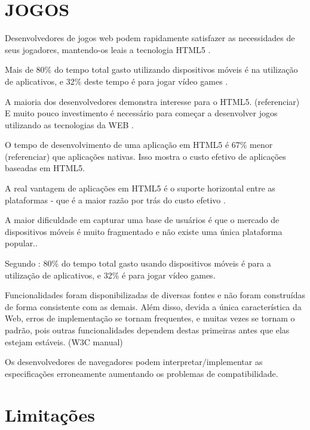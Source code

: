 
\section{JOGOS}

\begin{draft}
Desenvolvedores de jogos web podem rapidamente satisfazer as
necessidades de seus jogadores, mantendo-os leais a tecnologia HTML5
\autocite{developingEffect}.

Mais de 80\% do tempo total gasto utilizando dispositivos móveis é na
utilização de aplicativos, e 32\% deste tempo é para jogar vídeo
games \autocite{HTML5CrossPlatformGameDevelopment}.

A maioria dos desenvolvedores demonstra interesse para o HTML5.
(referenciar) E muito pouco investimento é necessário para
começar a desenvolver jogos utilizando as tecnologias da WEB
\autocite{html5mostwanted}.

O tempo de desenvolvimento de uma aplicação em HTML5 é 67\% menor
(referenciar) que aplicações nativas. Isso mostra o custo efetivo de
aplicações baseadas em HTML5.

A real vantagem de aplicações em HTML5 é o suporte horizontal entre
as plataformas - que é a maior razão por trás do custo efetivo \autocite{html5Tradeoffs}.

A maior dificuldade em capturar uma base de usuários é que o mercado
de dispositivos móveis é muito fragmentado e não existe uma única
plataforma popular.\autocite{html5Tradeoffs}.

Segundo \cite{HTML5CrossPlatformGameDevelopment}: 80\% do tempo total
gasto usando dispositivos móveis é para a utilização de aplicativos,
e 32\% é para jogar vídeo games.

Funcionalidades foram disponibilizadas de diversas fontes e não foram
construídas de forma consistente com as demais. Além disso,
devida a única característica da Web, erros de implementação se
tornam frequentes, e muitas vezes se tornam o padrão, pois outras
funcionalidades dependem destas primeiras antes que elas estejam
estáveis. (W3C manual)

Os desenvolvedores de navegadores podem interpretar/implementar
as especificações erroneamente aumentando os problemas de
compatibilidade.

\section{Limitações}


\end{draft}
